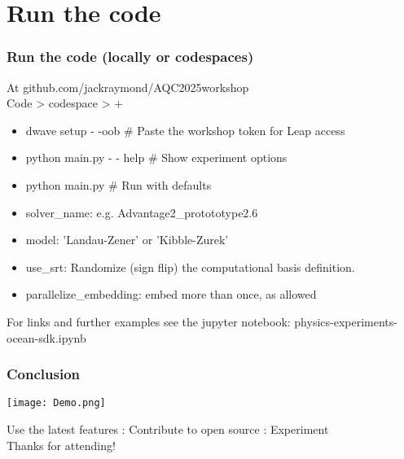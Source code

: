 \documentclass[aspectratio=169,final,11pt,forpublic]{beamer} %
\begin{document}
\section{Run the code}
\begin{frame}\frametitle{\bf Run the code (locally or codespaces)}
  At github.com/jackraymond/AQC2025workshop \\
  Code > codespace > +\\
  \begin{itemize}
    \item[] dwave setup - -oob  \# Paste the workshop token for Leap access
    \item[] python main.py - - help  \# Show experiment options
    \item[] python main.py  \# Run with defaults
  \end{itemize}

  \begin{itemize}
  \item solver\_name: e.g. Advantage2\_protototype2.6
  \item model: 'Landau-Zener' or 'Kibble-Zurek'
  \item use\_srt: Randomize (sign flip) the computational basis definition.
  \item parallelize\_embedding: embed more than once, as allowed
  \end{itemize}
  For links and further examples see the jupyter notebook:
  physics-experiments-ocean-sdk.ipynb
\end{frame}
  
\begin{frame}\frametitle{\bf Conclusion}

    \begin{center}
      \texttt{[image: Demo.png]}
    \end{center}
    Use the latest features : Contribute to open source : Experiment\\
    Thanks for attending!
\end{frame}
\end{document}
